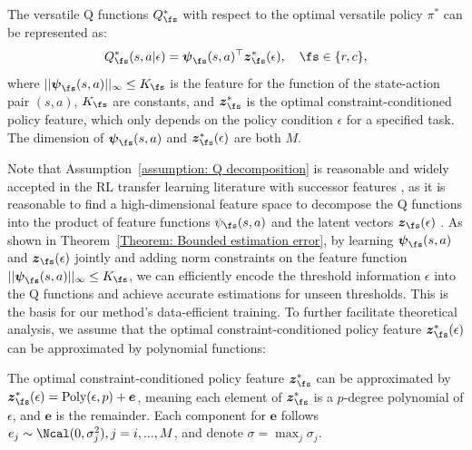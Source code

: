 \begin{Assumption} 
\label{assumption: Q decomposition}
The versatile Q functions $Q_\fs^*$ with respect to the optimal versatile policy $\pi^*$ can be represented as:
\begin{equation}
\label{equ: critics decomposition}
    Q_\fs^*(s, a|\epsilon) = \boldsymbol{\psi}_\fs(s, a)^\top \boldsymbol{z}_\fs^*(\epsilon), \quad \fs \in \{r, c\},
\end{equation}
where $||\boldsymbol{\psi}_\fs(s, a)||_\infty \leq K_\fs$ is the feature for the function of the state-action pair $(s, a)$, $K_\fs$ are constants, and $\boldsymbol{z}_\fs^*$ is the optimal constraint-conditioned policy feature, which only depends on the policy condition $\epsilon$ for a specified task. The dimension of $\boldsymbol{\psi}_\fs(s, a)$ and $\boldsymbol{z}_\fs^*(\epsilon)$ are both $M$.
\end{Assumption}
Note that Assumption~\ref{assumption: Q decomposition} is reasonable and widely accepted in the RL transfer learning literature with successor features \cite{barreto2018transfer}, as it is reasonable to find a high-dimensional feature space to decompose the Q functions into the product of feature functions $\psi_{\fs}(s, a)$ and the latent vectors $\boldsymbol{z}_{\fs}(\epsilon)$ \cite{bengio2013representation}. 
As shown in Theorem~\ref{Theorem: Bounded estimation error}, by learning $\boldsymbol{\psi}_\fs(s, a)$ and $\boldsymbol{z}_\fs(\epsilon)$ jointly and adding norm constraints on the feature function $||\boldsymbol{\psi}_\fs(s, a)||_\infty \leq K_\fs$, we can efficiently encode the threshold information $\epsilon$ into the Q functions and achieve accurate estimations for unseen thresholds. This is the basis for our method's data-efficient training.
To further facilitate theoretical analysis, we assume that the optimal constraint-conditioned policy feature $\boldsymbol{z}_\fs^*(\epsilon)$ can be approximated by polynomial functions:
\begin{Assumption}
\label{assumption: Polynomial policy vector}
    The optimal constraint-conditioned policy feature $\boldsymbol{z}_\fs^*$ can be approximated by $\boldsymbol{z}_\fs^*(\epsilon) = \text{Poly}(\epsilon, p) + \boldsymbol{e}$, meaning each element of $\boldsymbol{z}_\fs^*$ is a $p$-degree polynomial of $\epsilon$, and $\boldsymbol{e}$ is the remainder. Each component for $\boldsymbol{e}$ follows $e_j \sim \Ncal(0, \sigma_j^2), j=i,...,M$, and denote $\sigma = \max_j \sigma_j$. 
\end{Assumption}
